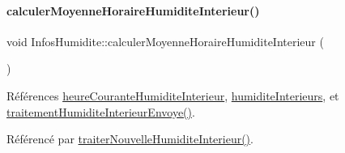 \paragraph{\texorpdfstring{calculer\+Moyenne\+Horaire\+Humidite\+Interieur()}{calculerMoyenneHoraireHumiditeInterieur()}}
{\footnotesize\ttfamily void Infos\+Humidite\+::calculer\+Moyenne\+Horaire\+Humidite\+Interieur (\begin{DoxyParamCaption}{ }\end{DoxyParamCaption})\hspace{0.3cm}{\ttfamily [private]}}



Références \hyperlink{class_infos_humidite_a5a8597751ba0fe10a14a12e155421485}{heure\+Courante\+Humidite\+Interieur}, \hyperlink{class_infos_humidite_a2bcd5b3629a007078d4e15d110dae457}{humidite\+Interieurs}, et \hyperlink{class_infos_humidite_a3643afa07ff3ac73a4190d77ce230d3b}{traitement\+Humidite\+Interieur\+Envoye()}.



Référencé par \hyperlink{class_infos_humidite_a0995d68a036f73df3b5a86e5538104bd}{traiter\+Nouvelle\+Humidite\+Interieur()}.


